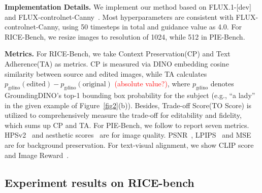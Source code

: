 \documentclass{article}
\begin{document}
\textbf{Implementation Details.} We implement our method based on FLUX.1-[dev]~\cite{blackforest2024FLUX} and FLUX-controlnet-Canny~\cite{xlabsai2025fluxcontrolnet}. Most hyperparameters are consistent with FLUX-controlnet-Canny, using 50 timesteps in total and guidance value as 4.0. For RICE-Bench, we resize images to resolution of 1024, while 512 in PIE-Bench.

\textbf{Metrics.} For RICE-Bench, we take Context Preservation(CP) and Text Adherence(TA) as metrics. CP is measured via DINO embedding \citep{caron2021emerging} cosine similarity between source and edited images, while TA calculates \( p_{\text{gdino}}(\text{edited}) - p_{\text{gdino}}(\text{original}) \) \textcolor{red}{(absolute value?)}, where \( p_{\text{gdino}} \) denotes GroundingDINO's \citep{liu2024grounding} top-1 bounding box probability for the subject (e.g., ``a lady'' in the given example of Figure~\ref{fig2}(b)). Besides, Trade-off Score(TO Score) is utilized to comprehensively measure the trade-off for editability and fidelity, which sums up CP and TA. For PIE-Bench, we follow \cite{zhu2025kv} to report seven metrics. HPSv2~\cite{wu2023human} and aesthetic scores~\cite{schuhmann2022laionb} are for image quality. PSNR~\cite{huynh2008scope}, LPIPS~\cite{zhang2018perceptual} and MSE are for background preservation. For text-visual alignment, we show CLIP score~\cite{radford2021learning} and Image Reward~\cite{xu2023imagereward}.

\subsection{Experiment results on RICE-bench}
\end{document}
